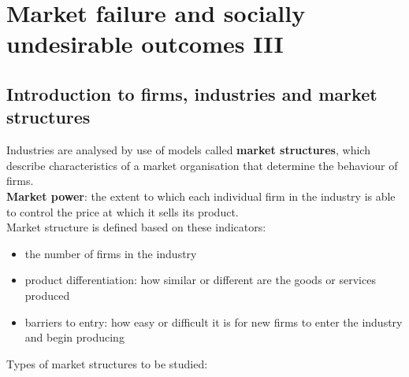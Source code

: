 \documentclass[a4paper,12pt]{article}
\newcommand{\needbold}[1]{\textcolor{red!70!black}{\textbf{#1}}}
\begin{document}
\section{Market failure and socially undesirable outcomes III}\label{sec:market-failure-3}
\subsection{Introduction to firms, industries and market structures}
Industries are analysed by use of models called \needbold{market structures}, which describe characteristics of a market organisation that determine the behaviour of firms.
\\\needbold{Market power}: the extent to which each individual firm in the industry is able to control the price at which it sells its product.\\
Market structure is defined based on these indicators:
\begin{itemize}
  \item the number of firms in the industry
  \item product differentiation: how similar or different are the goods or services produced
  \item barriers to entry: how easy or difficult it is for new firms to enter the industry and begin producing
\end{itemize}
Types of market structures to be studied:
\end{document}
